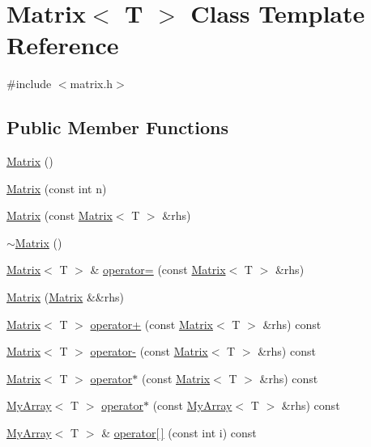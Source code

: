 \hypertarget{classMatrix}{}\section{Matrix$<$ T $>$ Class Template Reference}
\label{classMatrix}


{\ttfamily \#include $<$matrix.\+h$>$}

\subsection*{Public Member Functions}
\begin{DoxyCompactItemize}
\item 
\hyperlink{classMatrix_a9d567e3a121b1be0c3f9c461cab524fe}{Matrix} ()
\item 
\hyperlink{classMatrix_a19ffa179320a60ab6aeb0910f062895f}{Matrix} (const int n)
\item 
\hyperlink{classMatrix_a6a46705243036bfeee78fe2c84c54340}{Matrix} (const \hyperlink{classMatrix}{Matrix}$<$ T $>$ \&rhs)
\item 
\hyperlink{classMatrix_a91aa704de674203e96aece9e1955ccd3}{$\sim$\+Matrix} ()
\item 
\hyperlink{classMatrix}{Matrix}$<$ T $>$ \& \hyperlink{classMatrix_a01990eb2552555d37c83272125be68e6}{operator=} (const \hyperlink{classMatrix}{Matrix}$<$ T $>$ \&rhs)
\item 
\hyperlink{classMatrix_ac503fc6ce19453907fd9ad85133fef39}{Matrix} (\hyperlink{classMatrix}{Matrix} \&\&rhs)
\item 
\hyperlink{classMatrix}{Matrix}$<$ T $>$ \hyperlink{classMatrix_a9db4b4074daa2112eab910c7902fc5d9}{operator+} (const \hyperlink{classMatrix}{Matrix}$<$ T $>$ \&rhs) const 
\item 
\hyperlink{classMatrix}{Matrix}$<$ T $>$ \hyperlink{classMatrix_a06a7f018ed353f0a8239a80ec8403be6}{operator-\/} (const \hyperlink{classMatrix}{Matrix}$<$ T $>$ \&rhs) const 
\item 
\hyperlink{classMatrix}{Matrix}$<$ T $>$ \hyperlink{classMatrix_a358516deb804403fb91256a5a269d1e2}{operator$\ast$} (const \hyperlink{classMatrix}{Matrix}$<$ T $>$ \&rhs) const 
\item 
\hyperlink{classMyArray}{My\+Array}$<$ T $>$ \hyperlink{classMatrix_a70c46247336f74291cc3e1b2fb800a34}{operator$\ast$} (const \hyperlink{classMyArray}{My\+Array}$<$ T $>$ \&rhs) const 
\item 
\hyperlink{classMyArray}{My\+Array}$<$ T $>$ \& \hyperlink{classMatrix_a47c3685edce37163855474b360d91202}{operator\mbox{[}$\,$\mbox{]}} (const int i) const 

\end{DoxyCompactItemize}
